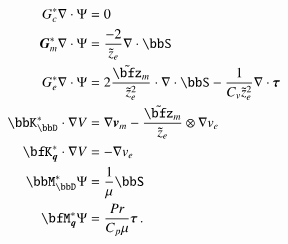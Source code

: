 \documentclass[preprint,12pt]{elsarticle}
\begin{document}
\begin{align*}
%
G^*_c\Div\Psi&=0
\\
\bfG^*_m\Div\Psi&=\frac{-2}{\tilde z_e}\Div\bbS
\\
G^*_e\Div\Psi&=2\frac{\tilde\bfz_m}{\tilde z_e^2}\cdot\Div\bbS-\frac{1}{C_v\tilde z_e^2}\Div\bftau\\
%
\bbK^*_\bbD\cdot\Grad V&=\Grad\bfv_m-\frac{\tilde\bfz_m}{\tilde z_e}\otimes\Grad v_e\\
\bfK^*_{\bfq}\cdot\Grad V&=-\Grad v_e\\
%
\bbM^*_\bbD\Psi&=\frac{1}{\mu}\bbS\\
\bfM^*_{\bfq}\Psi&=\frac{Pr}{C_p\mu}\bftau\,.
\end{align*}

 






\end{document}

